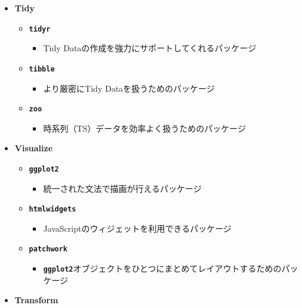 \documentclass[
  12pt,
]{book}
\providecommand{\tightlist}{%
  \setlength{\itemsep}{0pt}\setlength{\parskip}{0pt}}
\begin{document}
\begin{itemize}
\tightlist
\item
  \textbf{Tidy}

  \begin{itemize}
  \tightlist
  \item
    \textbf{\texttt{tidyr}} \citep{R-tidyr}

    \begin{itemize}
    \tightlist
    \item
      Tidy Dataの作成を強力にサポートしてくれるパッケージ
    \end{itemize}
  \item
    \textbf{\texttt{tibble}} \citep{R-tibble}

    \begin{itemize}
    \tightlist
    \item
      より厳密にTidy Dataを扱うためのパッケージ
    \end{itemize}
  \item
    \textbf{\texttt{zoo}} \citep{R-zoo}

    \begin{itemize}
    \tightlist
    \item
      時系列（TS）データを効率よく扱うためのパッケージ
    \end{itemize}
  \end{itemize}
\item
  \textbf{Visualize}

  \begin{itemize}
  \tightlist
  \item
    \textbf{\texttt{ggplot2}} \citep{R-ggplot2}

    \begin{itemize}
    \tightlist
    \item
      統一された文法で描画が行えるパッケージ
    \end{itemize}
  \item
    \textbf{\texttt{htmlwidgets}} \citep{R-htmlwidgets}

    \begin{itemize}
    \tightlist
    \item
      JavaScriptのウィジェットを利用できるパッケージ
    \end{itemize}
  \item
    \textbf{\texttt{patchwork}} \citep{R-patchwork}

    \begin{itemize}
    \tightlist
    \item
      \textbf{\texttt{ggplot2}}オブジェクトをひとつにまとめてレイアウトするためのパッケージ
    \end{itemize}
  \end{itemize}
\item
  \textbf{Transform}


\end{itemize}
\end{document}
